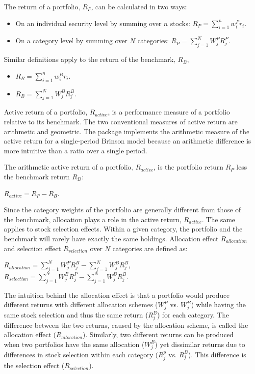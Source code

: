 The return of a portfolio, $R_P$, can be calculated in two ways:
\begin{itemize}
  \item On an individual security level by summing over $n$ stocks: $R_P =
    \sum\limits_{i = 1}^n w^P_ir_i$.
  \item On a category level by summing over $N$ categories: $R_P = \sum\limits_{j =
    1}^N W^P_jR^P_j$.
\end{itemize}

Similar definitions apply to the return of the benchmark, $R_B$,
\begin{itemize}
  \item $R_B = \sum\limits_{i = 1}^n w^B_ir_i$.
  \item $R_B = \sum\limits_{j = 1}^N W^B_jR^B_j$.
\end{itemize}

Active return of a portfolio, $R_{active}$, is a performance measure
of a portfolio relative to its benchmark. The two conventional
measures of active return are arithmetic and geometric.  The 
package implements the arithmetic measure of the active return for a
single-period Brinson model because an arithmetic difference is more
intuitive than a ratio over a single period.

The arithmetic active return of a portfolio, $R_{active}$, is the
portfolio return $R_P$ less the benchmark return $R_B$:
\begin{center}
  $R_{active} = R_P - R_B$.
\end{center}

Since the category weights of the portfolio are generally different
from those of the benchmark, allocation plays a role in the active
return, $R_{active}$. The same applies to stock selection effects. 
Within a given category, the portfolio and the benchmark will rarely 
have exactly the same holdings. Allocation effect
$R_{allocation}$ and selection effect $R_{selection}$ over $N$
categories are defined as:
\begin{center}
  $R_{allocation} = \sum\limits_{j = 1}^N W^P_jR^B_j - \sum\limits_{j
    = 1}^N W^B_jR^B_j$,
  $R_{selection} = \sum\limits_{j = 1}^N W^B_jR^P_j - \sum\limits_{j =
    1}^N W^B_jR^B_j$.
\end{center}

The intuition behind the allocation effect is that a portfolio would
produce different returns with different allocation schemes ($W^P_j$
vs. $W^B_j$) while having the same stock selection and thus the same
return ($R^B_j$) for each category. The difference between the two
returns, caused by the allocation scheme, is called the allocation
effect ($R_{allocation}$). Similarly, two different returns can be
produced when two portfolios have the same allocation ($W^B_j$) yet
dissimilar returns due to differences in stock selection within each
category ($R^p_j$ vs. $R^B_j$). This difference is the selection
effect ($R_{selection}$).

